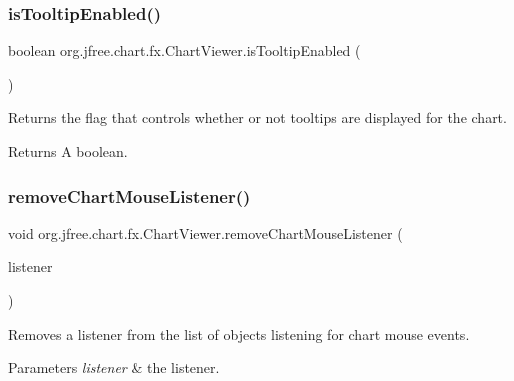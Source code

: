 \subsubsection{\texorpdfstring{is\+Tooltip\+Enabled()}{isTooltipEnabled()}}
{\footnotesize\ttfamily boolean org.\+jfree.\+chart.\+fx.\+Chart\+Viewer.\+is\+Tooltip\+Enabled (\begin{DoxyParamCaption}{ }\end{DoxyParamCaption})}

Returns the flag that controls whether or not tooltips are displayed for the chart.

\begin{DoxyReturn}{Returns}
A boolean. 
\end{DoxyReturn}
\mbox{\label{classorg_1_1jfree_1_1chart_1_1fx_1_1_chart_viewer_a628e7821016d16c266830bd5d7507799}} 
\subsubsection{\texorpdfstring{remove\+Chart\+Mouse\+Listener()}{removeChartMouseListener()}}
{\footnotesize\ttfamily void org.\+jfree.\+chart.\+fx.\+Chart\+Viewer.\+remove\+Chart\+Mouse\+Listener (\begin{DoxyParamCaption}\item[{\mbox{\hyperlink{interfaceorg_1_1jfree_1_1chart_1_1fx_1_1interaction_1_1_chart_mouse_listener_f_x}{Chart\+Mouse\+Listener\+FX}}}]{listener }\end{DoxyParamCaption})}

Removes a listener from the list of objects listening for chart mouse events.


\begin{DoxyParams}{Parameters}
{\em listener} & the listener. \\
\hline
\end{DoxyParams}
\mbox{\label{classorg_1_1jfree_1_1chart_1_1fx_1_1_chart_viewer_ae4f3627a0cbf9f989301265d869c445f}} 
